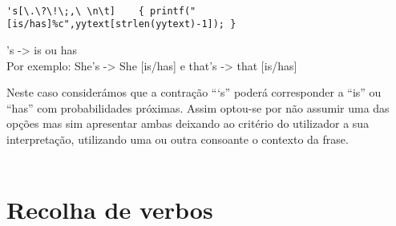 \documentclass{report}
\begin{document}
\\
\begin{verbatim}
's[\.\?\!\;,\ \n\t]    { printf(" [is/has]%c",yytext[strlen(yytext)-1]); }
\end{verbatim}
's -> is ou has
\\
Por exemplo:
She's -> She [is/has]   e  that's -> that [is/has]

Neste caso considerámos que a contração “‘s” poderá corresponder a “is” ou “has” com probabilidades próximas. Assim optou-se por não assumir uma das opções mas sim apresentar ambas deixando ao critério do utilizador a sua interpretação, utilizando uma ou outra consoante o contexto da frase.
\\
\\
\section{Recolha de verbos}
\end{document}

